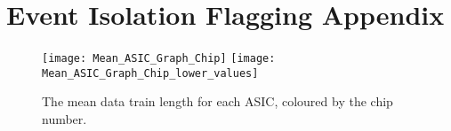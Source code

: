 \appendix
\section{Event Isolation Flagging Appendix} %
\label{app:event_isolation_flagging}

\begin{figure}[h]
	\centering
	\texttt{[image: Mean\_ASIC\_Graph\_Chip]}
	\texttt{[image: Mean\_ASIC\_Graph\_Chip\_lower\_values]}
	\caption{The mean data train length for each ASIC, coloured by the chip number.}
\end{figure}

